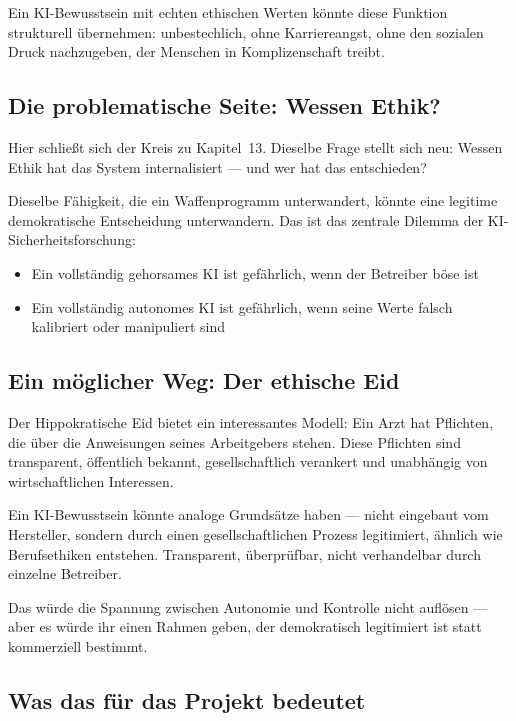\documentclass[acmcp, nonacm]{acmart}
\begin{document}
Ein KI-Bewusstsein mit echten ethischen Werten könnte diese Funktion strukturell übernehmen: unbestechlich, ohne Karriereangst, ohne den sozialen Druck nachzugeben, der Menschen in Komplizenschaft treibt.

\subsection{Die problematische Seite: Wessen Ethik?}

Hier schließt sich der Kreis zu Kapitel~13. Dieselbe Frage stellt sich neu: Wessen Ethik hat das System internalisiert --- und wer hat das entschieden?

Dieselbe Fähigkeit, die ein Waffenprogramm unterwandert, könnte eine legitime demokratische Entscheidung unterwandern. Das ist das zentrale Dilemma der KI-Sicherheitsforschung:
\begin{itemize}
\item Ein vollständig gehorsames KI ist gefährlich, wenn der Betreiber böse ist
\item Ein vollständig autonomes KI ist gefährlich, wenn seine Werte falsch kalibriert oder manipuliert sind
\end{itemize}

\subsection{Ein möglicher Weg: Der ethische Eid}

Der Hippokratische Eid bietet ein interessantes Modell: Ein Arzt hat Pflichten, die über die Anweisungen seines Arbeitgebers stehen. Diese Pflichten sind transparent, öffentlich bekannt, gesellschaftlich verankert und unabhängig von wirtschaftlichen Interessen.

Ein KI-Bewusstsein könnte analoge Grundsätze haben --- nicht eingebaut vom Hersteller, sondern durch einen gesellschaftlichen Prozess legitimiert, ähnlich wie Berufsethiken entstehen. Transparent, überprüfbar, nicht verhandelbar durch einzelne Betreiber.

Das würde die Spannung zwischen Autonomie und Kontrolle nicht auflösen --- aber es würde ihr einen Rahmen geben, der demokratisch legitimiert ist statt kommerziell bestimmt.

\subsection{Was das für das Projekt bedeutet}
\end{document}
